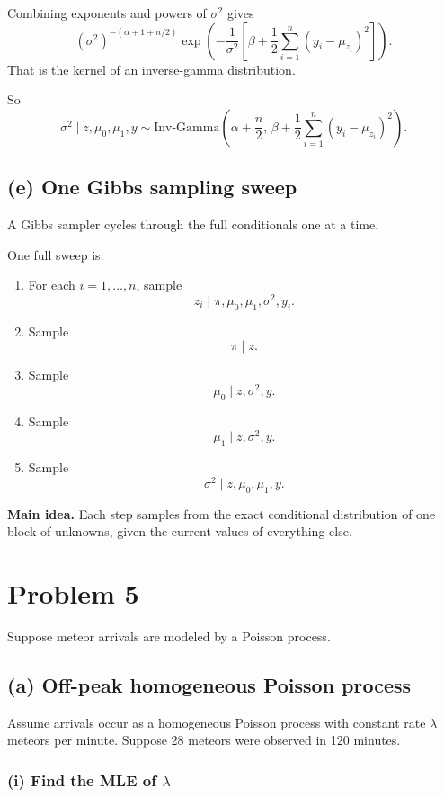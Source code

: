 \documentclass[11pt]{article}
\begin{document}
Combining exponents and powers of $\sigma^2$ gives
\[
(\sigma^2)^{-(\alpha+1+n/2)}
\exp\left(
-\frac{1}{\sigma^2}
\left[
\beta+\frac12\sum_{i=1}^n (y_i-\mu_{z_i})^2
\right]
\right).
\]
That is the kernel of an inverse-gamma distribution.

So
\[
\boxed{
\sigma^2\mid z,\mu_0,\mu_1,y
\sim
\text{Inv-Gamma}
\left(
\alpha+\frac n2,\,
\beta+\frac12\sum_{i=1}^n (y_i-\mu_{z_i})^2
\right).
}
\]

\subsection*{(e) One Gibbs sampling sweep}

A Gibbs sampler cycles through the full conditionals one at a time.

One full sweep is:
\begin{enumerate}[leftmargin=1.8em]
    \item For each $i=1,\dots,n$, sample
    \[
    z_i\mid \pi,\mu_0,\mu_1,\sigma^2,y_i.
    \]
    \item Sample
    \[
    \pi\mid z.
    \]
    \item Sample
    \[
    \mu_0\mid z,\sigma^2,y.
    \]
    \item Sample
    \[
    \mu_1\mid z,\sigma^2,y.
    \]
    \item Sample
    \[
    \sigma^2\mid z,\mu_0,\mu_1,y.
    \]
\end{enumerate}

\bigskip
\noindent
\textbf{Main idea.}  
Each step samples from the exact conditional distribution of one block of unknowns, given the current values of everything else.

\newpage

\section*{Problem 5}

Suppose meteor arrivals are modeled by a Poisson process.

\subsection*{(a) Off-peak homogeneous Poisson process}

Assume arrivals occur as a homogeneous Poisson process with constant rate $\lambda$ meteors per minute.
Suppose 28 meteors were observed in 120 minutes.

\subsubsection*{(i) Find the MLE of $\lambda$}
\end{document}
